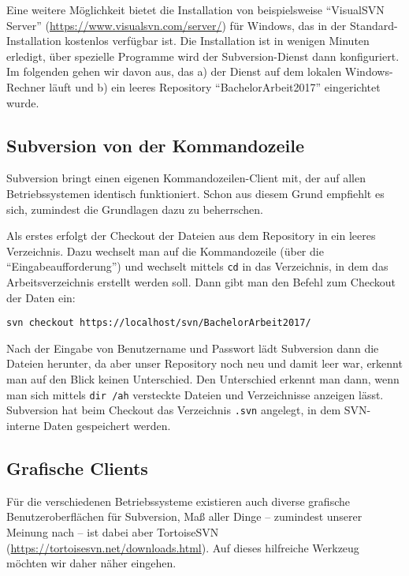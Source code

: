 Eine weitere Möglichkeit bietet die Installation von beispielsweise \enquote{VisualSVN Server} (\url{https://www.visualsvn.com/server/}) für Windows, das in der Standard-Installation kostenlos verfügbar ist. Die Installation ist in wenigen Minuten erledigt, über spezielle Programme wird der Subversion-Dienst dann konfiguriert. Im folgenden gehen wir davon aus, das a) der Dienst auf dem lokalen Windows-Rechner läuft und b) ein leeres Repository \enquote{BachelorArbeit2017} eingerichtet wurde.


\subsection{Subversion von der Kommandozeile}

Subversion bringt einen eigenen Kommandozeilen-Client mit, der auf allen Betriebssystemen identisch funktioniert. Schon aus diesem Grund empfiehlt es sich, zumindest die Grundlagen dazu zu beherrschen.

Als erstes erfolgt der Checkout der Dateien aus dem Repository in ein leeres Verzeichnis. Dazu wechselt man auf die Kommandozeile (über die \enquote{Eingabeaufforderung}) und wechselt mittels \texttt{cd} in das Verzeichnis, in dem das Arbeitsverzeichnis erstellt werden soll. Dann gibt man den Befehl zum Checkout der Daten ein:

\texttt{svn checkout https://localhost/svn/BachelorArbeit2017/}

Nach der Eingabe von Benutzername und Passwort lädt Subversion dann die Dateien herunter, da aber unser Repository noch neu und damit leer war, erkennt man auf den Blick keinen Unterschied. Den Unterschied erkennt man dann, wenn man sich mittels \texttt{dir /ah} versteckte Dateien und Verzeichnisse anzeigen lässt. Subversion hat beim Checkout das Verzeichnis \texttt{.svn} angelegt, in dem SVN-interne Daten gespeichert werden. 


\subsection{Grafische Clients}

Für die verschiedenen Betriebssysteme existieren auch diverse grafische Benutzeroberflächen für Subversion, Maß aller Dinge -- zumindest unserer Meinung nach -- ist dabei aber TortoiseSVN (\url{https://tortoisesvn.net/downloads.html}). Auf dieses hilfreiche Werkzeug möchten wir daher näher  eingehen.



